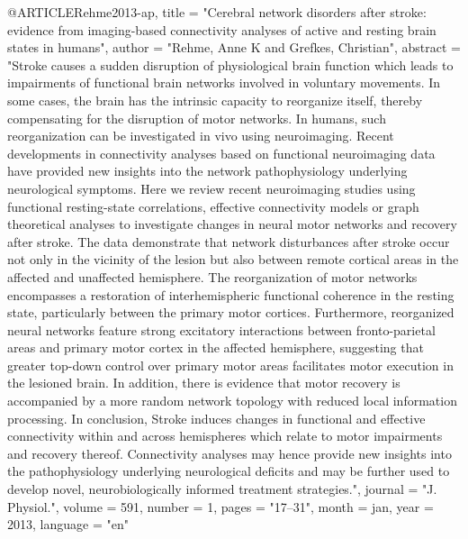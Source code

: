 @ARTICLE{Rehme2013-ap,
	title    = "Cerebral network disorders after stroke: evidence from
	imaging-based connectivity analyses of active and resting brain
	states in humans",
	author   = "Rehme, Anne K and Grefkes, Christian",
	abstract = "Stroke causes a sudden disruption of physiological brain function
	which leads to impairments of functional brain networks involved
	in voluntary movements. In some cases, the brain has the
	intrinsic capacity to reorganize itself, thereby compensating for
	the disruption of motor networks. In humans, such reorganization
	can be investigated in vivo using neuroimaging. Recent
	developments in connectivity analyses based on functional
	neuroimaging data have provided new insights into the network
	pathophysiology underlying neurological symptoms. Here we review
	recent neuroimaging studies using functional resting-state
	correlations, effective connectivity models or graph theoretical
	analyses to investigate changes in neural motor networks and
	recovery after stroke. The data demonstrate that network
	disturbances after stroke occur not only in the vicinity of the
	lesion but also between remote cortical areas in the affected and
	unaffected hemisphere. The reorganization of motor networks
	encompasses a restoration of interhemispheric functional
	coherence in the resting state, particularly between the primary
	motor cortices. Furthermore, reorganized neural networks feature
	strong excitatory interactions between fronto-parietal areas and
	primary motor cortex in the affected hemisphere, suggesting that
	greater top-down control over primary motor areas facilitates
	motor execution in the lesioned brain. In addition, there is
	evidence that motor recovery is accompanied by a more random
	network topology with reduced local information processing. In
	conclusion, Stroke induces changes in functional and effective
	connectivity within and across hemispheres which relate to motor
	impairments and recovery thereof. Connectivity analyses may hence
	provide new insights into the pathophysiology underlying
	neurological deficits and may be further used to develop novel,
	neurobiologically informed treatment strategies.",
	journal  = "J. Physiol.",
	volume   =  591,
	number   =  1,
	pages    = "17--31",
	month    =  jan,
	year     =  2013,
	language = "en"
}

